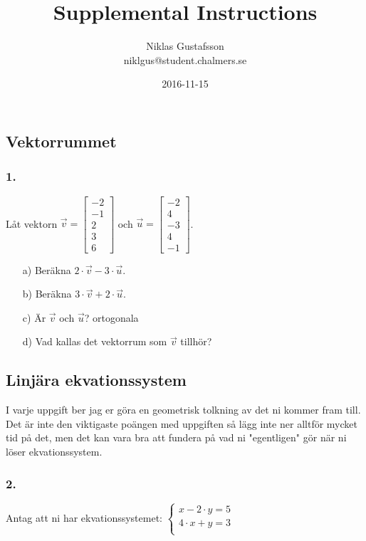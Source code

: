 \documentclass{article}
\title{Supplemental Instructions}
\author{Niklas Gustafsson \\ 
		\small{niklgus@student.chalmers.se}
}
\date{
      2016-11-15
     }
\begin{document}
\maketitle
\subsection*{Vektorrummet}
\subsubsection*{1.}
Låt vektorn $\vec{v}=\begin{bmatrix}-2 \\ -1 \\ 2 \\ 3 \\ 6 \end{bmatrix}$ och $\vec{u}=\begin{bmatrix}-2 \\ 4 \\ -3 \\ 4 \\ -1 \end{bmatrix}$.
\begin{itemize}
\item[a) ] Beräkna $2\cdot\vec{v}-3\cdot\vec{u}$.
\item[b) ] Beräkna $3\cdot\vec{v}+2\cdot\vec{u}$.
\item[c) ] Är $\vec{v}$ och $\vec{u}$? ortogonala
\item[d) ] Vad kallas det vektorrum som $\vec{v}$ tillhör? 
\end{itemize}


\subsection*{Linjära ekvationssystem}

I varje uppgift ber jag er göra en geometrisk tolkning av det ni kommer fram till. Det är inte den viktigaste poängen med uppgiften så lägg inte ner alltför mycket tid på det, men det kan vara bra att fundera på vad ni "egentligen" gör när ni löser ekvationssystem. 

\subsubsection*{2.}
Antag att ni har ekvationssystemet:
\begin{math}
	\begin{cases}
	x - 2 \cdot y = 5 \\
	4 \cdot x + y = 3 \\
	\end{cases}
\end{math}
\end{document}
